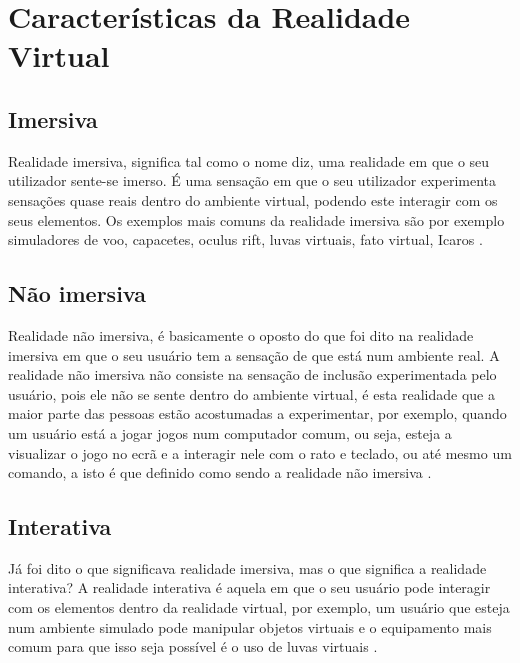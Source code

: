 \chapter{Características da Realidade Virtual}

\section{Imersiva}

Realidade imersiva, significa tal como o nome diz, uma realidade em que o seu utilizador sente-se imerso. É uma sensação em que o seu utilizador experimenta sensações quase reais dentro do ambiente virtual, podendo este interagir com os seus elementos. 
Os exemplos mais comuns da realidade imersiva são por exemplo simuladores de voo, capacetes, oculus rift, luvas virtuais, fato virtual, Icaros \cite{RV_inter}. 

\section{Não imersiva}

Realidade não imersiva, é basicamente o oposto do que foi dito na realidade imersiva em que o seu usuário tem a sensação de que está num ambiente real. A realidade não imersiva não consiste na sensação de inclusão experimentada pelo usuário, pois ele não se sente dentro do ambiente virtual, é esta realidade que a maior parte das pessoas estão acostumadas a experimentar, por exemplo, quando um usuário está a jogar jogos num computador comum, ou seja, esteja a visualizar o jogo no ecrã e a interagir nele com o rato e teclado, ou até mesmo um comando, a isto é que definido como sendo a realidade não imersiva \cite{RV_inter}.

\section{Interativa}
Já foi dito o que significava realidade imersiva, mas o que significa a realidade interativa? 
A realidade interativa é aquela em que o seu usuário pode interagir com os elementos dentro da realidade virtual, por exemplo, um usuário que esteja num ambiente simulado pode manipular objetos virtuais e o equipamento mais comum para que isso seja possível é o uso de luvas virtuais \cite{RV_inter}.







